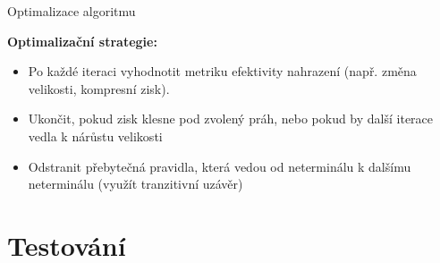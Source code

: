 \documentclass[lualatex,hyperref={pdfencoding=auto}]{beamer}
\begin{document}
\begin{frame}{Optimalizace algoritmu}

  \textbf{Optimalizační strategie:}
  \begin{itemize}
    \item Po každé iteraci vyhodnotit metriku efektivity nahrazení (např. změna velikosti, kompresní zisk).
    \item Ukončit, pokud zisk klesne pod zvolený práh, nebo pokud by další iterace vedla k nárůstu velikosti %
    \item Odstranit přebytečná pravidla, která vedou od neterminálu k dalšímu neterminálu (využít tranzitivní uzávěr)
  \end{itemize}
\end{frame}



\section{Testování}
\end{document}
